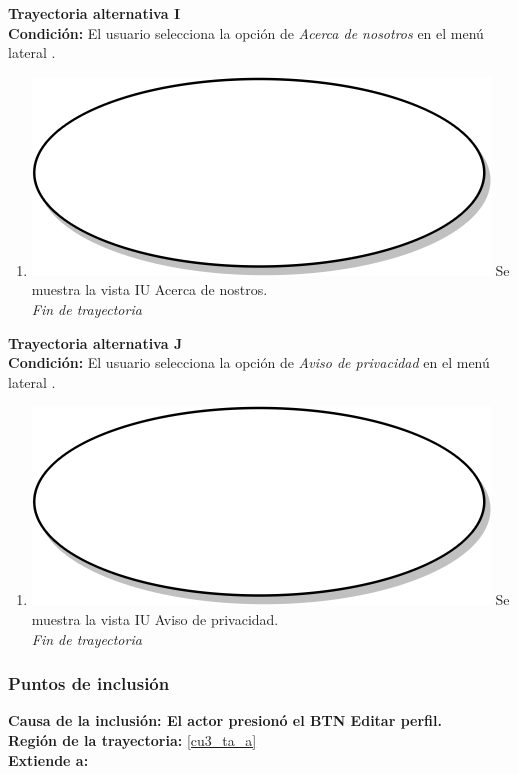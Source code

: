 \textbf{Trayectoria alternativa I} \label{cu3_ta_i} \\
\textbf{Condición:} El usuario selecciona la opción de \textit{Acerca de nosotros} en el menú lateral \textbf{}. \\
 \begin{enumerate}[label=I\arabic*]
    \item {\includegraphics[scale=.05]{Capitulo3/img/proceso.png} Se muestra la vista IU Acerca de nostros.} \\
    \textit{Fin de trayectoria} \\
\end{enumerate}

\textbf{Trayectoria alternativa J} \label{cu3_ta_j} \\
\textbf{Condición:} El usuario selecciona la opción de \textit{Aviso de privacidad} en el menú lateral \textbf{}. \\
 \begin{enumerate}[label=J\arabic*]
    \item {\includegraphics[scale=.05]{Capitulo3/img/proceso.png} Se muestra la vista IU Aviso de privacidad.} \\
    \textit{Fin de trayectoria} \\
\end{enumerate}

\subsubsection{Puntos de inclusión}
\noindent \textbf{Causa de la inclusión: El actor presionó el BTN Editar perfil.} \\
\textbf{Región de la trayectoria:} \ref{cu3_ta_a}\\
\textbf{Extiende a:} \textbf{}

